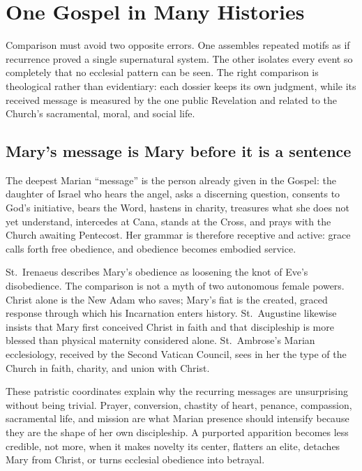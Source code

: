 \section{One Gospel in Many Histories}

Comparison must avoid two opposite errors. One assembles repeated motifs as if recurrence proved a single supernatural system. The other isolates every event so completely that no ecclesial pattern can be seen. The right comparison is theological rather than evidentiary: each dossier keeps its own judgment, while its received message is measured by the one public Revelation and related to the Church's sacramental, moral, and social life.

\subsection{Mary's message is Mary before it is a sentence}

The deepest Marian ``message'' is the person already given in the Gospel: the daughter of Israel who hears the angel, asks a discerning question, consents to God's initiative, bears the Word, hastens in charity, treasures what she does not yet understand, intercedes at Cana, stands at the Cross, and prays with the Church awaiting Pentecost. Her grammar is therefore receptive and active: grace calls forth free obedience, and obedience becomes embodied service.

St.~Irenaeus describes Mary's obedience as loosening the knot of Eve's disobedience. The comparison is not a myth of two autonomous female powers. Christ alone is the New Adam who saves; Mary's fiat is the created, graced response through which his Incarnation enters history. St.~Augustine likewise insists that Mary first conceived Christ in faith and that discipleship is more blessed than physical maternity considered alone. St.~Ambrose's Marian ecclesiology, received by the Second Vatican Council, sees in her the type of the Church in faith, charity, and union with Christ.

These patristic coordinates explain why the recurring messages are unsurprising without being trivial. Prayer, conversion, chastity of heart, penance, compassion, sacramental life, and mission are what Marian presence should intensify because they are the shape of her own discipleship. A purported apparition becomes less credible, not more, when it makes novelty its center, flatters an elite, detaches Mary from Christ, or turns ecclesial obedience into betrayal.


